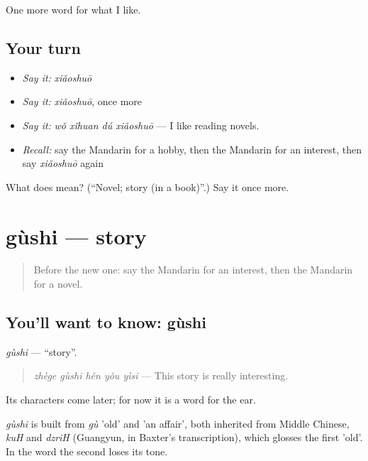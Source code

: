 \begin{grammarlens}[title={What you've built}]
One more word for what I like.
\end{grammarlens}

\subsection*{Your turn}
\begin{itemize}
\raggedright
  \item \emph{Say it:} \emph{xiǎoshuō}
  \item \emph{Say it:} \emph{xiǎoshuō}, once more
  \item \emph{Say it:} \emph{wǒ xǐhuan dú xiǎoshuō} — I like reading novels.
  \item \emph{Recall:} say the Mandarin for a hobby, then the Mandarin for an interest, then say \emph{xiǎoshuō} again
\end{itemize}

\begin{tcolorbox}[breakable,colback=teal!4,colframe=teal!35!black,title={Before you move on}]
What does  mean? (\textquotedblleft{}Novel; story (in a book)\textquotedblright{}.) Say it once more.
\end{tcolorbox}
\section[gùshi]{gùshi — story}

\label{lesson:ZH-C250-gushi}



\begin{quote}
Before the new one: say the Mandarin for an interest, then the Mandarin for a novel.
\end{quote}

\subsection*{You'll want to know: gùshi}
\emph{gùshi} — \textquotedblleft{}story\textquotedblright{}.

\begin{quote}
\emph{zhège gùshi hěn yǒu yìsi} — This story is really interesting.
\end{quote}

Its characters come later; for now it is a word for the ear.

\begin{cousinweb}
\emph{gùshi} is built from \emph{gù} 'old' and  'an affair', both inherited from Middle Chinese, \emph{kuH} and \emph{dzriH} (Guangyun, in Baxter's transcription), which glosses the first 'old'. In the word the second loses its tone.
\end{cousinweb}

